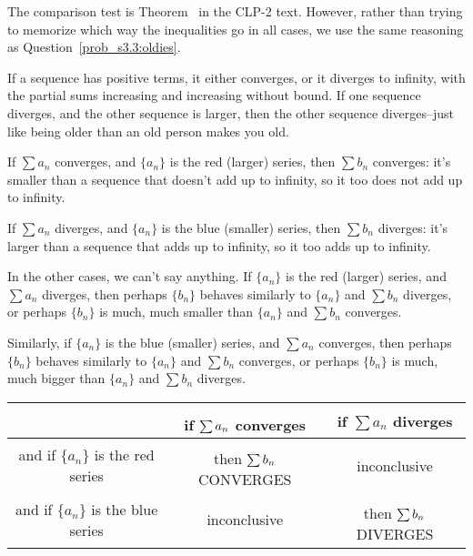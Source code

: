 \begin{solution}
The comparison test is Theorem~ in the CLP-2 text. However, rather than trying to memorize which way the inequalities go in all cases, we  use the same reasoning as Question~\ref{prob_s3.3:oldies}.

If a sequence has positive terms, it either converges, or it diverges to infinity, with the partial sums increasing and increasing without bound. If one sequence diverges, and the other sequence is larger, then the other sequence diverges--just like being older than an old person makes you old.

If $\sum a_n$ converges, and $\{a_n\}$ is the red (larger) series, then $\sum b_n$ converges: it's smaller than a sequence that doesn't add up to infinity, so it too does not add up to infinity.

If $\sum a_n$ diverges, and $\{a_n\}$ is the blue (smaller) series, then $\sum b_n$ diverges: it's larger than a sequence that adds up to infinity, so it too adds up to infinity.

In the other cases, we can't say anything. If $\{a_n\}$ is the red (larger) series, and  $\sum a_n$ diverges, then perhaps $\{b_n\}$ behaves similarly to $\{a_n\}$ and $\sum b_n$ diverges, or perhaps $\{b_n\}$ is much, much smaller than $\{a_n\}$ and $\sum b_n$ converges.

Similarly, if $\{a_n\}$ is the blue (smaller) series, and  $\sum a_n$ converges, then perhaps $\{b_n\}$ behaves similarly to $\{a_n\}$ and $\sum b_n$ converges, or perhaps $\{b_n\}$ is much, much bigger than $\{a_n\}$ and $\sum b_n$ diverges.

\begin{center}
\begin{tabular}{|c|c|c|}
\hline
& if $\sum\limits^{\vphantom{\frac12}} a_n$ converges & if $\sum a_n$ diverges\\[10pt]
\hline
\color{red} and if $\{a_n\}$ is the red series& \color{blue}then $\sum\limits^{\vphantom{\frac12}} b_n$ CONVERGES&inconclusive \\[10pt]
\hline
\color{blue} and if $\{a_n\}$ is the blue series&inconclusive& \color{red}then $\sum\limits^{\vphantom{\frac12}} b_n$ DIVERGES\\[10pt]
\hline
\end{tabular}
\end{center}
\end{solution}

